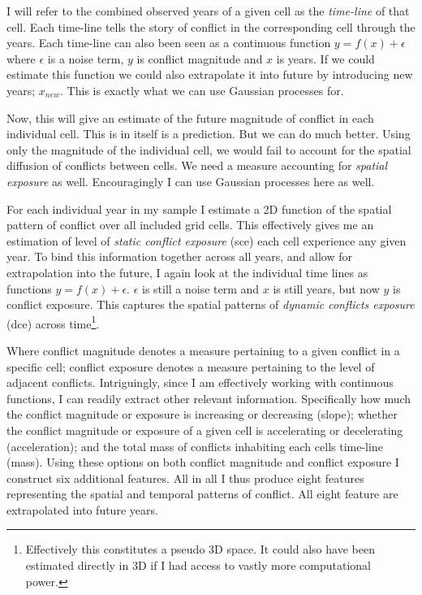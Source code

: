 \documentclass[a4paper]{article}
\begin{document}
I will refer to the combined observed years of a given cell as the \emph{time-line} of that cell. Each time-line tells the story of conflict in the corresponding cell through the years. Each time-line can also been seen as a continuous function $y = f(x) + \epsilon$ where $\epsilon$ is a noise term, $y$ is conflict magnitude and $x$ is years. If we could estimate this function we could also extrapolate it into future by introducing new years; $x_{new}$. This is exactly what we can use Gaussian processes for.\par

Now, this will give an estimate of the future magnitude of conflict in each individual cell. This is in itself is a prediction. But we can do much better. Using only the magnitude of the individual cell, we would fail to account for the spatial diffusion of conflicts between cells. We need a measure accounting for \emph{spatial exposure} as well. Encouragingly I can use Gaussian processes here as well.\par

For each individual year in my sample I estimate a 2D function of the spatial pattern of conflict over all included grid cells. This effectively gives me an estimation of level of \emph{static conflict exposure} (sce) each cell experience any given year. To bind this information together across all years, and allow for extrapolation into the future, I again look at the individual time lines as functions $y = f(x) + \epsilon$. $\epsilon$ is still a noise term and $x$ is still years, but now $y$ is conflict exposure. This captures the spatial patterns of \emph{dynamic conflicts exposure} (dce) across time\footnote{Effectively this constitutes a pseudo 3D space. It could also have been estimated directly in 3D if I had access to vastly more computational power.}.\par

Where conflict magnitude denotes a measure pertaining to a given conflict in a specific cell; conflict exposure denotes a measure pertaining to the level of adjacent conflicts. Intriguingly, since I am effectively working with continuous functions, I can readily extract other relevant information. Specifically how much the conflict magnitude or exposure is increasing or decreasing (slope); whether the conflict magnitude or exposure of a given cell is accelerating or decelerating (acceleration); and the total mass of conflicts inhabiting each cells time-line (mass). Using these options on both conflict magnitude and conflict exposure I construct six additional features. All in all I thus produce eight features representing the spatial and temporal patterns of conflict. All eight feature are extrapolated into future years.\par
\end{document}
